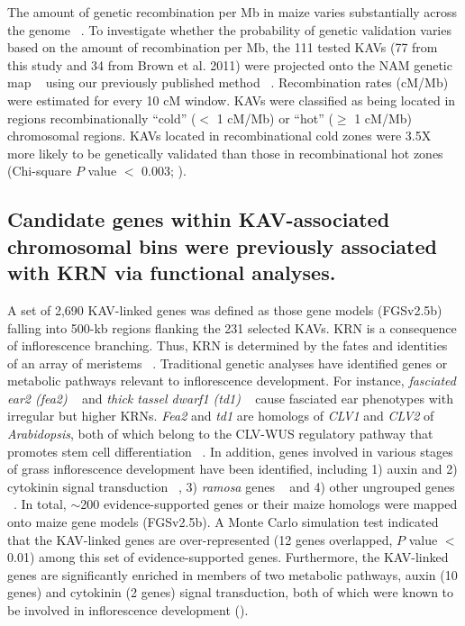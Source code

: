 \documentclass[10pt,letterpaper]{article}
\begin{document}
The amount of genetic recombination per Mb in maize varies substantially across the genome ~\cite{Fu2002}. To investigate whether the probability of genetic validation varies based on the amount of recombination per Mb, the 111 tested KAVs (77 from this study and 34 from Brown et al. 2011) were projected onto the NAM genetic map ~\cite{Buckler2009} using our previously published method ~\cite{Liu2009}. Recombination rates (cM/Mb) were estimated for every 10 cM window. KAVs were classified as being located in regions recombinationally “cold” ($<$ 1 cM/Mb) or “hot” ($\geq$ 1 cM/Mb) chromosomal regions. KAVs located in recombinational cold zones were 3.5X more likely to be genetically validated than those in recombinational hot zones (Chi-square $P$ value $<$ 0.003; ). 

\subsection*{Candidate genes within KAV-associated chromosomal bins were previously associated with KRN via functional analyses.}
A set of 2,690 KAV-linked genes was defined as those gene models (FGSv2.5b) falling into 500-kb regions flanking the 231 selected KAVs. KRN is a consequence of inflorescence branching. Thus, KRN is determined by the fates and identities of an array of meristems ~\cite{Barazesh2008}. Traditional genetic analyses have identified genes or metabolic pathways relevant to inflorescence development. For instance, \emph{fasciated ear2 (fea2)} ~\cite{Bommert2013} and \emph{thick tassel dwarf1 (td1)} ~\cite{Bommert2005} cause fasciated ear phenotypes with irregular but higher KRNs. \emph{Fea2} and \emph{td1} are homologs of \emph{CLV1} and \emph{CLV2} of \emph{Arabidopsis}, both of which belong to the CLV-WUS regulatory pathway that promotes stem cell differentiation ~\cite{Clark2001}. In addition, genes involved in various stages of grass inflorescence development have been identified, including 1) auxin and 2) cytokinin signal transduction ~\cite{Barazesh2008, Sigmon2010}, 3) \emph{ramosa} genes ~\cite{Bortiri2006} and 4) other ungrouped genes ~\cite{McSteen2001, Upadyayula2006, Xu2011}. In total, $\sim$200 evidence-supported genes or their maize homologs were mapped onto maize gene models (FGSv2.5b). A Monte Carlo simulation test indicated that the KAV-linked genes are over-represented (12 genes overlapped, $P$ value $<$ 0.01) among this set of evidence-supported genes. Furthermore, the KAV-linked genes are significantly enriched in members of two metabolic pathways, auxin (10 genes) and cytokinin (2 genes) signal transduction, both of which were known to be involved in inflorescence development (). 
\end{document}
